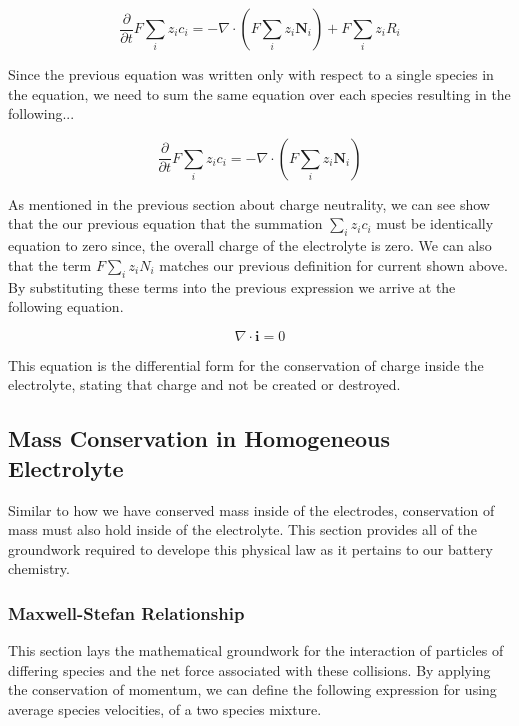 \documentclass[lettersize,journal]{IEEEtran}
\begin{document}
\begin{equation}
  \frac{\partial}{\partial t} F \sum_{i} z_{i} c_{i}=-\nabla \cdot\left(F \sum_{i} z_{i} \mathbf{N}_{i}\right)+F \sum_{i} z_{i} R_{i}
\end{equation}

Since the previous equation was written only with respect to a single species in the equation, we need to sum the same equation over each species resulting in the following...

\begin{equation}
  \frac{\partial}{\partial t} F \sum_{i} z_{i} c_{i}=-\nabla \cdot\left(F \sum_{i} z_{i} \mathbf{N}_{i}\right)
\end{equation}

As mentioned in the previous section about charge neutrality, we can see show that the our previous equation that the summation $\sum_{i}z_{i}c_{i}$ must be identically equation to zero since, the overall charge of the electrolyte is zero. We can also that the term $F\sum_{i}z_{i}N_{i}$ matches our previous definition for current shown above. By substituting these terms into the previous expression we arrive at the following equation.

\begin{equation}
  \nabla \cdot \mathbf{i}=0
\end{equation}

This equation is the differential form for the conservation of charge inside the electrolyte, stating that charge and not be created or destroyed.

\subsection{Mass Conservation in Homogeneous Electrolyte}
Similar to how we have conserved mass inside of the electrodes, conservation of mass must also hold inside of the electrolyte. This section provides all of the groundwork required to develope this physical law as it pertains to our battery chemistry. \\

\subsubsection{Maxwell-Stefan Relationship}
This section lays the mathematical groundwork for the interaction of particles of differing species and the net force associated with these collisions. By applying the conservation of momentum, we can define the following expression for using average species velocities, of a two species mixture.
\end{document}

